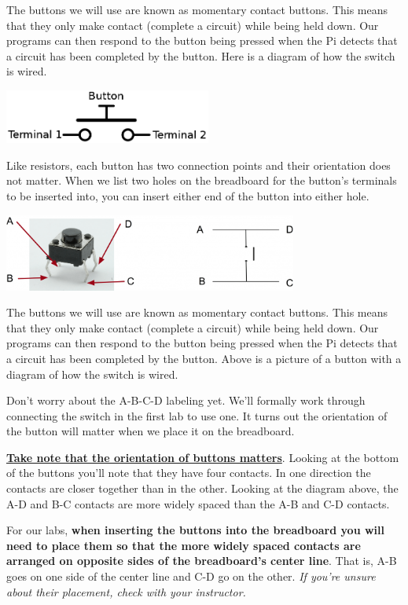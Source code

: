 \begin{enumerate}
The buttons we will use are known as momentary contact buttons. This means that they only make contact (complete a circuit) while being held down. Our programs can then respond to the button being pressed when the Pi detects that a circuit has been completed by the button. Here is a diagram of how the switch is wired.

\beforefig
\centerline{\includegraphics[height=0.70in]{pi_images/button_schematic.png}}
\afterfig

Like resistors, each button has two connection points and their orientation does not matter. When we list two holes on the breadboard for the button's terminals to be inserted into, you can insert either end of the button into either hole.

\iffalse %

\beforefig
\centerline{\includegraphics[height=1.00in]{pi_images/Push-Switch-fs8-1024x269.png}}
\afterfig

The buttons we will use are known as momentary contact buttons. This means that they only make contact (complete a circuit) while being held down. Our programs can then respond to the button being pressed when the Pi detects that a circuit has been completed by the button. Above is a picture of a button with a diagram of how the switch is wired.

Don't worry about the A-B-C-D labeling yet. We'll formally work through connecting the switch in the first lab to use one. It turns out the orientation of the button will matter when we place it on the breadboard.

\textbf{\underline{Take note that the orientation of buttons matters}}. Looking at the bottom of the buttons you'll note that they have four contacts. In one direction the contacts are closer together than in the other. Looking at the diagram above, the A-D and B-C contacts are more widely spaced than the A-B and C-D contacts.

For our labs, \textbf{when inserting the buttons into the breadboard you will need to place them so that the more widely spaced contacts are arranged on opposite sides of the breadboard's center line}. That is, A-B goes on one side of the center line and C-D go on the other. \textit{If you're unsure about their placement, check with your instructor.}


\end{enumerate}
